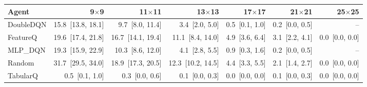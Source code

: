 \begin{tabular}{lrrrrrr}
\toprule
Agent & 9$\times$9 & 11$\times$11 & 13$\times$13 & 17$\times$17 & 21$\times$21 & 25$\times$25 \\
\midrule
DoubleDQN & 15.8~[13.8, 18.1] & 9.7~[8.0, 11.4] & 3.4~[2.0, 5.0] & 0.5~[0.1, 1.0] & 0.2~[0.0, 0.5] & -- \\
FeatureQ & 19.6~[17.4, 21.8] & 16.7~[14.1, 19.4] & 11.1~[8.4, 14.0] & 4.9~[3.6, 6.4] & 3.1~[2.2, 4.1] & 0.0~[0.0, 0.0] \\
MLP_DQN & 19.3~[15.9, 22.9] & 10.3~[8.6, 12.0] & 4.1~[2.8, 5.5] & 0.9~[0.3, 1.6] & 0.2~[0.0, 0.5] & -- \\
Random & 31.7~[29.5, 34.0] & 18.9~[17.3, 20.5] & 12.3~[10.2, 14.5] & 4.4~[3.3, 5.5] & 2.1~[1.4, 2.7] & 0.0~[0.0, 0.0] \\
TabularQ & 0.5~[0.1, 1.0] & 0.3~[0.0, 0.6] & 0.1~[0.0, 0.3] & 0.0~[0.0, 0.0] & 0.1~[0.0, 0.3] & 0.0~[0.0, 0.0] \\
\bottomrule
\end{tabular}